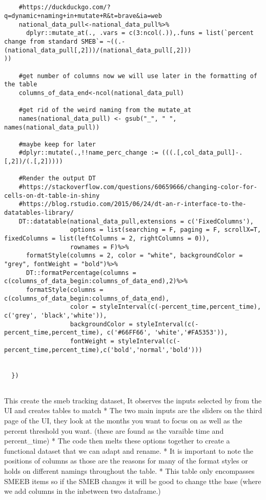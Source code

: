 \documentclass[
]{article}
\begin{document}
\begin{verbatim}
    
    
    #https://duckduckgo.com/?q=dynamic+naming+in+mutate+R&t=brave&ia=web
    national_data_pull<-national_data_pull%>%
      dplyr::mutate_at(., .vars = c(3:ncol(.)),.funs = list(`percent change from standard SMEB`= ~((.-(national_data_pull[,2]))/(national_data_pull[,2]))                                                        ))
    
    #get number of columns now we will use later in the formatting of the table 
    columns_of_data_end<-ncol(national_data_pull)
    
    #get rid of the weird naming from the mutate_at
    names(national_data_pull) <- gsub("_", " ", names(national_data_pull))
    
    #maybe keep for later
    #dplyr::mutate(.,!!name_perc_change := (((.[,col_data_pull]-.[,2])/(.[,2]))))
    
    #Render the output DT
    #https://stackoverflow.com/questions/60659666/changing-color-for-cells-on-dt-table-in-shiny
    #https://blog.rstudio.com/2015/06/24/dt-an-r-interface-to-the-datatables-library/
    DT::datatable(national_data_pull,extensions = c('FixedColumns'), 
                  options = list(searching = F, paging = F, scrollX=T, fixedColumns = list(leftColumns = 2, rightColumns = 0)),
                  rownames = F)%>%
      formatStyle(columns = 2, color = "white", backgroundColor = "grey", fontWeight = "bold")%>%
      DT::formatPercentage(columns = c(columns_of_data_begin:columns_of_data_end),2)%>%
      formatStyle(columns = c(columns_of_data_begin:columns_of_data_end),
                  color = styleInterval(c(-percent_time,percent_time), c('grey', 'black','white')),
                  backgroundColor = styleInterval(c(-percent_time,percent_time), c('#66FF66', 'white','#FA5353')),
                  fontWeight = styleInterval(c(-percent_time,percent_time),c('bold','normal','bold')))
    
    
  })
  
\end{verbatim}

This create the smeb tracking dataset, It observes the inputs selected
by from the UI and creates tables to match * The two main inputs are the
sliders on the third page of the UI, they look at the months you want to
focus on as well as the percent threshold you want. (these are found as
the varaible time and percent\_time) * The code then melts these options
together to create a functional dataset that we can adapt and rename. *
It is important to note the positions of columns as those are the
reasons for many of the format styles or holds on different namings
throughout the table. * This table only encompasses SMEEB items so if
the SMEB changes it will be good to change tthe base (where we add
columns in the inbetween two dataframe.)
\end{document}
